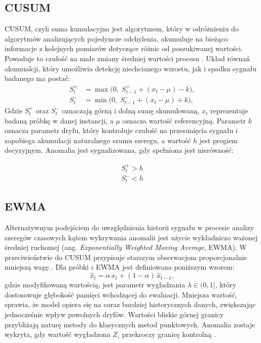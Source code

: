 \documentclass[a4paper,twoside,12pt]{book}
\newcommand{\obcy}[1]{\emph{#1}}
\newcommand{\english}[1]{{\selectlanguage{british}\obcy{#1}}}
\begin{document}
	\subsection{CUSUM}
	CUSUM, czyli suma kumulacyjna jest algorytmem, który w odróżnieniu do algorytmów analizujących pojedyncze odchylenia, akumuluje na bieżąco informacje z kolejnych pomiarów dotyczące różnic od poszukiwanej wartości. Powoduje to czułość na małe zmiany średniej wartości procesu \cite{riaz2011improving}. Układ równań akumualcji, który umożliwia detekcję niechcianego wzrostu, jak i spadku sygnału badanego ma postać:
	 \begin{align}
	 	S_t^+ &= \max\!\bigl(0,\; S_{t-1}^+ + (x_t - \mu) - k\bigr),
	 	\label{eq:cusum_pos} \\
	 	S_t^- &= \min\!\bigl(0,\; S_{t-1}^- + (x_t - \mu) + k\bigr),
	 	\label{eq:cusum_neg}
	 \end{align}
	Gdzie $S_t^+$ oraz $S_t^-$ oznaczają górną i dolną sumę skumulowaną, $x_t$ reprezentuje badaną próbkę w danej instancji, a $\mu$ oznacza wartość referencyjną.  Parametr $k$ oznacza parametr dryfu, który kontroluje czułość na przesunięcia sygnału i zapobiega akumulacji naturalnego szumu szeregu, a wartość $h$ jest progiem decyzyjnym. Anomalia jest sygnalizowana, gdy spełniona jest nierówność:

	\begin{align}
		S_t^+ > h \\
		S_t^- < h
	\end{align}
		
	\subsection{EWMA}
	Alternatywnym podejściem  do uwzględnienia historii sygnału w procesie analizy szeregów czasowych kątem wykrywania anomalii jest użycie wykładniczo ważonej średniej ruchomej (ang. \english{Exponentially Weighted Moving Average}, EWMA). W przeciwieństwie do CUSUM przypisuje  starszym obserwacjom proporcjonalnie mniejszą wagę \cite{vcisar2011optimization}. Dla próbki $i$ EWMA jest definiowana poniższym wzorem:
	\begin{equation}
		\hat{x}_t = \alpha\, x_t + (1 - \alpha)\, \hat{x}_{t-1},
		\label{eq:ewma}
	\end{equation}
	gdzie modyfikowaną wartością, jest parametr wygładzania $\lambda \in (0,1]$, który dostosowuje głębokość pamięci wchodzącej do ewaluacji. Mniejsza wartość, sprawia, że model opiera się na coraz bardziej historycznych  danych, zwiększając jednocześnie wpływ powolnych dryfów. Wartości bliskie górnej granicy przybliżają naturę metody do klasycznych metod punktowych. Anomalia zostaje wykryta, gdy wartość wygładzona $Z_i$ przekroczy granicę kontrolną \cite{vcisar2011optimization}. 
	
\end{document}
